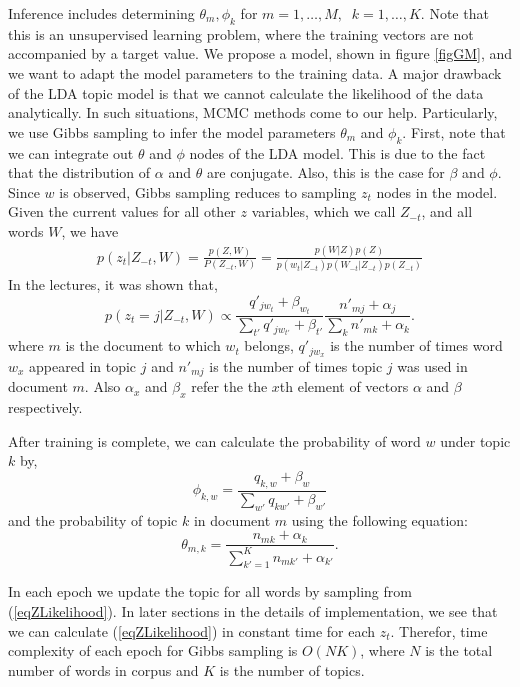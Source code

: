 \documentclass[twoside,12pt]{article}
\begin{document}
Inference includes determining $\theta_m, \phi_k$ for $m=1,\ldots,M,\;\; k=1,\ldots,K$. Note that this is an unsupervised learning problem, where the training vectors are not accompanied by a target value. We propose a model, shown in figure \ref{figGM}, and we want to adapt the model parameters to the training data. A major drawback of the LDA topic model is that we cannot calculate the likelihood of the data analytically. In such situations, MCMC methods come to our help. Particularly, we use Gibbs sampling to infer the model parameters $\theta_m$ and $\phi_k$. First, note that we can integrate out $\theta$ and $\phi$ nodes of the LDA model. This is due to the fact that the distribution of $\alpha$ and $\theta$ are conjugate. Also, this is the case for $\beta$ and $\phi$. Since $w$ is observed, Gibbs sampling reduces to sampling $z_t$ nodes in the model. Given the current values for all other $z$ variables, which we call $Z_{-t}$, and all words $W$, we have
\begin{align}
p(z_t|Z_{-t},W)=\frac{p(Z,W)}{P(Z_{-t},W)}=\frac{p(W|Z)p(Z)}{p(w_t|Z_{-t})p(W_{-t}|Z_{-t})p(Z_{-t})}
\end{align}
In the lectures, it was shown that,
\begin{equation}
\label{eqZLikelihood}
p(z_t=j|Z_{-t},W)\propto \frac{q'_{jw_t}+\beta_{w_t}}{\sum_{t'} q'_{jw_{t'}}+\beta_{t'}}\frac{n'_{mj}+\alpha_j}{\sum_k n'_{mk}+\alpha_k}.
\end{equation}
where $m$ is the document to which $w_t$ belongs, $q'_{jw_{x}}$ is the number of times word $w_x$ appeared in topic $j$ and $n'_{mj}$ is the number of times topic $j$ was used in document $m$. Also $\alpha_x$ and $\beta_x$ refer the the $x$th element of vectors $\alpha$ and $\beta$ respectively.

After training is complete, we can calculate the probability of word $w$ under topic $k$ by,
\begin{equation}
\phi_{k,w}=\frac{q_{k,w}+\beta_{w}}{\sum_{w'} q_{kw'}+\beta_{w'}}
\end{equation}
 and the probability of topic $k$ in document $m$ using the following equation:
\begin{equation}
\theta_{m,k}=\frac{n_{mk}+\alpha_k}{\sum_{k'=1}^K n_{mk'}+\alpha_{k'}}.
\end{equation}


In each epoch we update the topic for all words by sampling from (\ref{eqZLikelihood}). In later sections in the details of implementation, we see that we can calculate (\ref{eqZLikelihood}) in constant time for each $z_t$. Therefor, time complexity of each epoch for Gibbs sampling is $O(NK)$, where $N$ is the total number of words in corpus and $K$ is the number of topics.
\end{document}
